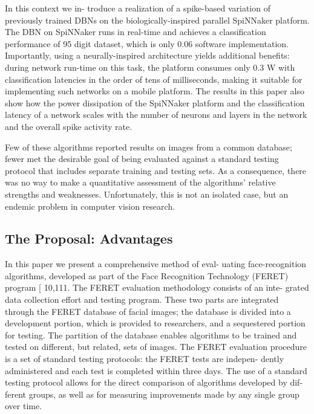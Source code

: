 In  this  context  we  in-
troduce  a  realization  of  a  spike-based  variation  of  previously
trained  DBNs  on  the  biologically-inspired  parallel  SpiNNaker
platform. The DBN on SpiNNaker runs in real-time and achieves
a classification performance of 95%
digit  dataset,  which  is  only  0.06%
software implementation. Importantly, using a neurally-inspired
architecture yields additional benefits: during network run-time
on this task, the platform consumes only 0.3 W with classification
latencies in the order of tens of milliseconds, making it suitable
for  implementing  such  networks  on  a  mobile  platform.  The
results in this paper also show how the power dissipation of the
SpiNNaker platform and the classification latency of a network
scales with the number of neurons and layers in the network and
the overall spike activity rate.


Few of these algorithms reported results on images from a common database; fewer met the desirable goal of being evaluated against a standard testing protocol that includes separate training and testing sets.
As a consequence, there was no way to make a quantitative assessment of the algorithms' relative strengths and weaknesses.
Unfortunately, this is not an isolated case, but an endemic problem in computer vision research.



\subsection{The Proposal: Advantages}
In this paper we present a comprehensive method of eval-
uating face-recognition
algorithms, developed as part of the
Face Recognition Technology (FERET) program [ 10,111.
The FERET evaluation methodology consists of an inte-
grated data collection effort and testing program. These
two parts are integrated through the FERET database of
facial images; the database is divided into a development
portion, which is provided to researchers, and a sequestered
portion for testing. The partition of the database enables
algorithms to be trained and tested on different, but related,
sets of images. The FERET evaluation procedure is a set of
standard testing protocols: the FERET tests are indepen-
dently administered
and each test is completed within
three days. The use of a standard testing protocol allows
for the direct comparison of algorithms developed by dif-
ferent groups, as well as for measuring improvements made
by any single group over time.

